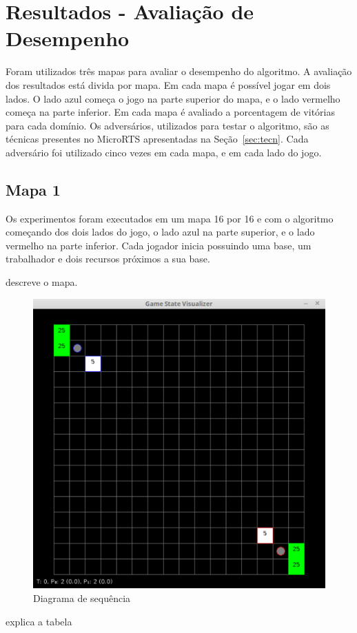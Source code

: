 
\chapter{\label{chap:ativ}Resultados - Avaliação de Desempenho}

Foram utilizados três mapas para avaliar o desempenho do algoritmo.
A avaliação dos resultados está divida por mapa.
Em cada mapa é possível jogar em dois lados.
O lado azul começa o jogo na parte superior do mapa, e o lado vermelho começa na parte inferior.
Em cada mapa é avaliado a porcentagem de vitórias para cada domínio.
Os adversários, utilizados para testar o algoritmo, são as técnicas presentes no MicroRTS apresentadas na Seção~\ref{sec:tecn}.
Cada adversário foi utilizado cinco vezes em cada mapa, e em cada lado do jogo.

\section{Mapa 1}

Os experimentos foram executados em um mapa 16 por 16 e com o algoritmo começando dos dois lados do jogo, o lado azul na parte superior, e o lado vermelho na parte inferior. Cada jogador inicia possuindo uma base, um trabalhador e dois recursos próximos a sua base.


descreve o mapa.

\begin{figure}[ht]
	\centering
	\includegraphics[width=.6\textwidth]{fig/map16x16.pdf}
	\caption{Diagrama de sequência}
	\label{fig:mapa16x16}
\end{figure}


explica a tabela


